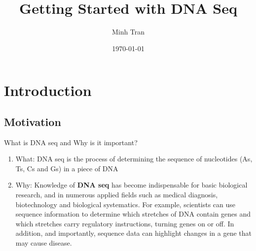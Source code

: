 \documentclass[11pt, a4paper]{article}
\title{Getting Started with DNA Seq} %
\author{
Minh Tran %
    \institution{Whatever} %
  }
\date{\small \today}
\begin{document}
%

\maketitle %

\begin{center} %
\end{center}

\setcounter{page}{1} %

\section{Introduction} %
\subsection{Motivation} %
What is DNA seq and Why is it important?
\begin{enumerate}
    \item What: DNA seq is the process of determining the sequence of nucleotides (As, Ts, Cs and Gs) in a piece of DNA
    \item Why: Knowledge of \textbf{DNA seq} has become indispensable for  basic biological research, and in numerous applied fields such as medical diagnosis, biotechnology and biological systematics. For example, scientists can use sequence information to determine which stretches of DNA contain genes and which stretches carry regulatory instructions, turning genes on or off. In addition, and importantly, sequence data can highlight changes in a gene that may cause disease.
\end{enumerate}
\end{document}
